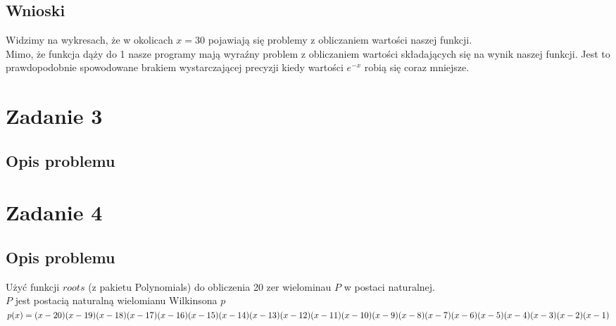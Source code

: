 \documentclass{article}
\begin{document}
\subsection*{Wnioski}
	Widzimy na wykresach, że w okolicach $x = 30$ pojawiają się problemy z obliczaniem wartości naszej funkcji. \\
	Mimo, że funkcja dąży do 1 nasze programy mają wyraźny problem z obliczaniem wartości składających się na wynik naszej funkcji.
	Jest to prawdopodobnie spowodowane brakiem wystarczającej precyzji kiedy wartości $e^{-x}$ robią się coraz mniejsze.

\section*{Zadanie 3}
\subsection*{Opis problemu}

\section*{Zadanie 4}
\subsection*{Opis problemu}
	Użyć funkcji $roots$ (z pakietu Polynomials) do obliczenia 20 zer wielominau $P$ w postaci naturalnej. \\
	$P$ jest postacią naturalną wielomianu Wilkinsona $p$ \\
	$p(x) = (x - 20)(x - 19)(x - 18)(x - 17)(x - 16)(x - 15) \\
			(x - 14)(x - 13)(x - 12)(x - 11)(x - 10)(x - 9) \\
			(x - 8)(x - 7)(x - 6)(x - 5)(x - 4)(x - 3)(x - 2)(x - 1)$
\end{document}
